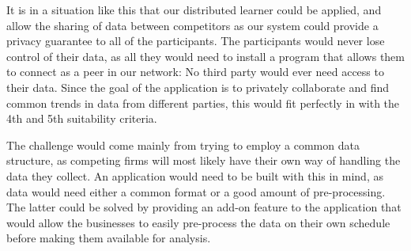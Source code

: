 It is in a situation like this that our distributed learner could be applied, and allow the sharing of data between competitors as our system could provide a privacy guarantee to all of the participants. The participants would never lose control of their data, as all they would need to install a program that allows them to connect as a peer in our network: No third party would ever need access to their data. Since the goal of the application is to privately collaborate and find common trends in data from different parties, this would fit perfectly in with the 4th and 5th suitability criteria. 

The challenge would come mainly from trying to employ a common data structure, as competing firms will most likely have their own way of handling the data they collect. An application would need to be built with this in mind, as data would need either a common format or a good amount of pre-processing. The latter could be solved by providing an add-on feature to the application that would allow the businesses to easily pre-process the data on their own schedule before making them available for analysis.    



\cleardoublepage 